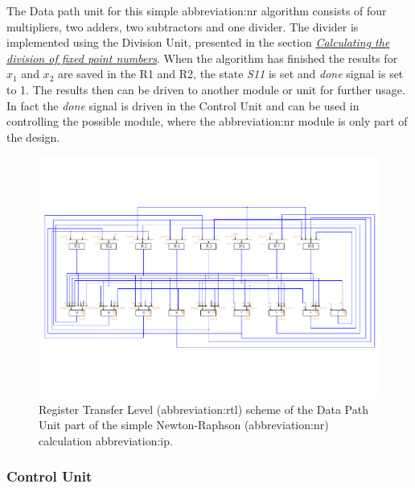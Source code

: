 \documentclass[a4paper, twoside, 11pt]{article}
\newcommand{\fbar}{\FloatBarrier}
\begin{document}
            The Data path unit for this simple \gls{abbreviation:nr} algorithm consists of four multipliers, two adders, two subtractors and one divider. The divider is implemented using the Division Unit, presented in the section \hyperref[sec:calculating-the-division-of-fixed-point-numbers]{\textit{Calculating the division of fixed point numbers}}. When the algorithm has finished the results for $x_1$ and $x_2$ are saved in the R1 and R2, the state \textit{S11} is set and \textit{done} signal is set to 1. The results then can be driven to another module or unit for further usage. In fact the \textit{done} signal is driven in the Control Unit and can be used in controlling the possible module, where the \gls{abbreviation:nr} module is only part of the design.
            \begin{figure}[htbp!]
                \centering
                \includegraphics[width=1\textwidth]{src/pdf/simple-nr-rtl.pdf}
                \caption{Register Transfer Level (\gls{abbreviation:rtl}) scheme of the Data Path Unit part of the simple Newton-Raphson (\gls{abbreviation:nr}) calculation \gls{abbreviation:ip}.}
                \label{fig:simple-nr-rtl}
                \end{figure}

        \fbar
        \subsubsection{Control Unit}\label{subsubsec:simple-nr-control-unit}
\end{document}
